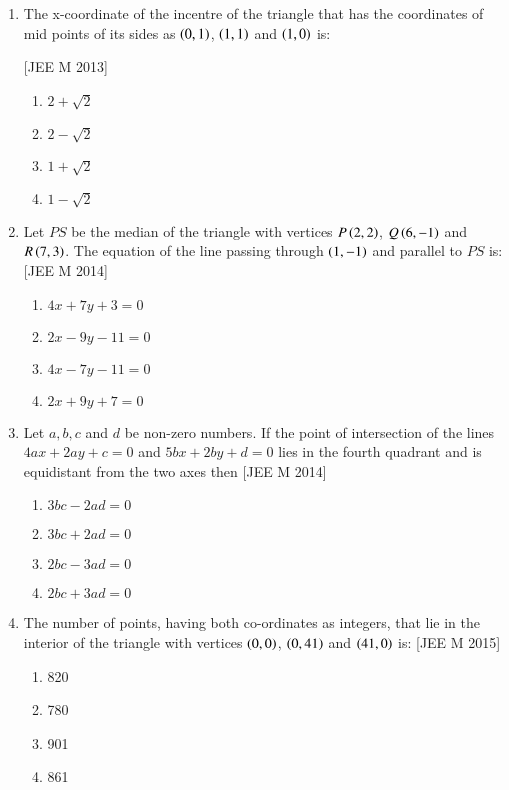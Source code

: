 \documentclass[journal,12pt,twocolumn]{IEEEtran}
\theoremstyle{remark}
\begin{document}
\begin{enumerate}
\item The x-coordinate of the incentre of the triangle that has the coordinates of mid points of its sides as $\left(0, 1\right)$, $\left(1, 1\right)$ and $\left(1, 0\right)$ is:

\hfill{[JEE M 2013]}
\begin{multicols}{4}
\begin{enumerate}[label=(\alph*)]
\item $2+\sqrt{2}$
\item $2-\sqrt{2}$
\item $1+\sqrt{2}$
\item $1-\sqrt{2}$
\end{enumerate}
\end{multicols}

\item Let $PS$ be the median of the triangle with vertices $P\left(2, 2\right)$, $Q\left(6, -1\right)$ and $R\left(7,3\right)$. The equation of the line passing through $\left(1, -1\right)$ and parallel to $PS$ is: \hfill{[JEE M 2014]}
\begin{multicols}{2}
\begin{enumerate}[label=(\alph*)]
\item $4x+7y+3=0$
\item $2x-9y-11=0$
\item $4x-7y-11=0$
\item $2x+9y+7=0$
\end{enumerate}
\end{multicols}

\item Let $a, b, c$ and $d$ be non-zero numbers. If the point of intersection of the lines $4ax+2ay+c=0$ and $5bx+2by+d=0$ lies in the fourth quadrant and is equidistant from the two axes then \hfill{[JEE M 2014]}
\begin{multicols}{2}
\begin{enumerate}[label=(\alph*)]
\item $3bc-2ad= 0$
\item $3bc+2ad=0$
\item $2bc-3ad= 0$
\item $2bc+3ad=0$ 
\end{enumerate}
\end{multicols}

\item The number of points, having both co-ordinates as integers, 
that lie in the interior of the triangle with vertices $\left(0, 0\right)$,  $\left(0,41\right)$ and $\left(41, 0\right)$ is: \hfill{[JEE M 2015]}
\begin{multicols}{4}
\begin{enumerate}[label=(\alph*)]
\item 820
\item 780
\item 901
\item 861
\end{enumerate}
\end{multicols}


\end{enumerate}
\end{document}
